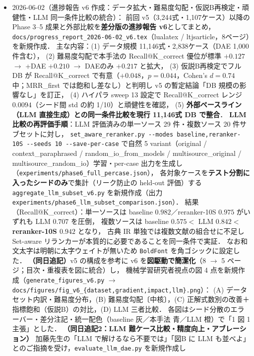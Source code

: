 \documentclass[11pt,a4paper]{jsarticle}
\begin{document}
\begin{itemize}[nosep]
  \item 2026-06-02（進捗報告 v6 作成：データ拡大・難易度勾配・仮説B再検定・頑健性・LLM 同一条件比較の統合）：
    前回 v5（3{,}244式・1{,}107ケース）以降の Phase 3--5 成果と外部比較を\textbf{差分版の進捗報告 v6}としてまとめ，
    \texttt{docs/progress\_report\_2026-06-02\_v6.tex}（lualatex / ltjsarticle，8ページ）を新規作成．
    主な内容：(1) データ規模 11{,}146式・2{,}838ケース（DAE 1{,}000件含む），
    (2) 難易度勾配で本手法の Recall@K\_correct 優位が標準 $+0.127$ $\to$ +DAE $+0.210$ $\to$ DAEのみ $+0.217$ と拡大，
    (3) 仮説B再検定でフル DB が Recall@K\_correct で有意（$+0.048$，$p=0.044$，Cohen's $d=0.74$ 中；MRR\_first では飽和し差なし）と判明し v5 の暫定結論「DB 規模の影響なし」を訂正，
    (4) ハイパラ sweep 13 設定で Recall@K\_correct レンジ $0.0094$（シード間 std の約 1/10）と頑健性を確認，
    (5) \textbf{外部ベースライン（LLM 直接生成）との同一条件比較を現行 11{,}146式 DB で整合}．
    \textbf{LLM 比較の再評価手順}：LLM 評価済みの単一ソース 29 件・複数ソース 20 件サブセットに対し，
    \texttt{set\_aware\_reranker.py -{}-modes baseline,reranker-10S -{}-seeds 10 -{}-save-per-case}
    で自然 5 variant（original / context\_paraphrased / random\_io\_from\_models / multisource\_original / multisource\_random\_io）学習・per-case 出力を生成し（\texttt{experiments/phase6\_full\_percase.json}），
    各対象ケースを\textbf{テスト分割に入ったシードのみ}で集計（リーク防止の held-out 評価）する \texttt{aggregate\_llm\_subset\_v6.py} を新規作成（出力 \texttt{experiments/phase6\_llm\_subset\_comparison.json}）．
    結果（Recall@K\_correct）：単一ソースは baseline $0.982$／reranker-10S $0.975$ がいずれも LLM $0.707$ を圧倒，
    複数ソースは baseline $0.575 <$ LLM $0.842 <$ \textbf{reranker-10S $0.942$} となり，
    古典 IR 単独では複数文献の組合せに不足し Set-aware リランカーが本質的に必要であることを同一条件で実証．
    なお和文太字は明朝に太字ウェイトが無いため \texttt{BoldFont} を角ゴシックに設定した．
    \textbf{（同日追記）}v5 の構成を参考に v6 を\textbf{図駆動で簡潔化}（8 $\to$ 5 ページ；目次・重複表を図に統合）し，
    機械学習研究者視点の図 4 点を新規作成（\texttt{generate\_figures\_v6.py} $\to$ \texttt{docs/figures/fig\_v6\_\{dataset,gradient,impact,llm\}.png}）：
    (A) データセット内訳・難易度分布，(B) 難易度勾配〔中核〕，(C) 正解式数別の改善＋指標飽和（仮説B）の対比，(D) LLM 三者比較．
    各図はシード分散のエラーバー・差分注記・統一配色（baseline 灰／本手法 青／LLM 橙）で「1 図 1 主張」とした．
    \textbf{（同日追記2：LLM 難ケース比較・精度向上・アブレーション）}
    加藤先生の「LLM で解けるなら不要では」「図B に LLM も並べよ」とのご指摘を受け，\texttt{evaluate\_llm\_dae.py} を新規作成し

\end{itemize}
\end{document}
